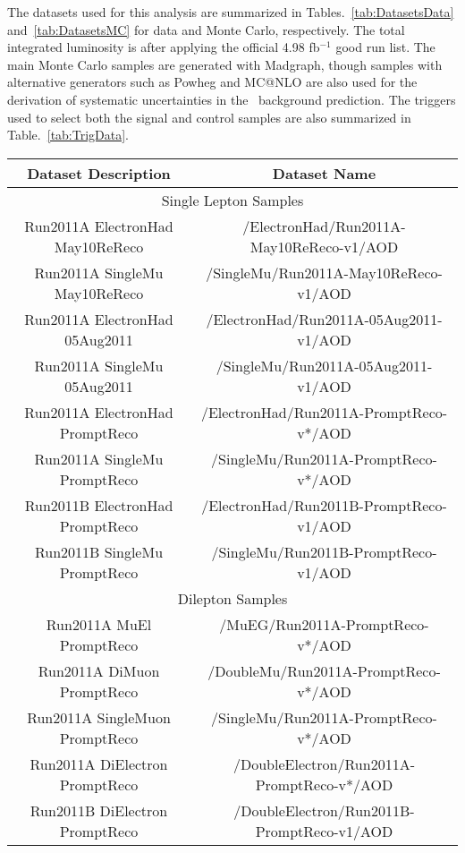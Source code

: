 
The datasets used for this analysis are summarized in 
Tables.~\ref{tab:DatasetsData} and~\ref{tab:DatasetsMC} for data and Monte 
Carlo, respectively. The total integrated luminosity is \lumi after
applying the official 4.98 fb$^{-1}$ good run list. The main Monte Carlo
samples are generated with Madgraph, though samples with
alternative generators such as Powheg and MC@NLO are also used for
the derivation of systematic uncertainties in the \ttbar~background prediction. 
The triggers used to select both the signal and control samples are
also summarized in Table.~\ref{tab:TrigData}.

\begin{table}[!ht]
\begin{center}
\begin{tabular}{c|c}
\hline
 Dataset Description                   &   Dataset Name   \\
\hline
\hline
\multicolumn{2}{c}{Single Lepton Samples} \\
\hline
Run2011A ElectronHad May10ReReco  & /ElectronHad/Run2011A-May10ReReco-v1/AOD \\
Run2011A SingleMu May10ReReco  & /SingleMu/Run2011A-May10ReReco-v1/AOD \\
Run2011A ElectronHad 05Aug2011  & /ElectronHad/Run2011A-05Aug2011-v1/AOD \\
Run2011A SingleMu 05Aug2011  & /SingleMu/Run2011A-05Aug2011-v1/AOD \\
Run2011A ElectronHad PromptReco  & /ElectronHad/Run2011A-PromptReco-v*/AOD \\
Run2011A SingleMu PromptReco  & /SingleMu/Run2011A-PromptReco-v*/AOD \\
Run2011B ElectronHad PromptReco  & /ElectronHad/Run2011B-PromptReco-v1/AOD \\
Run2011B SingleMu PromptReco  & /SingleMu/Run2011B-PromptReco-v1/AOD \\
\hline
\hline
\multicolumn{2}{c}{Dilepton Samples} \\
\hline
Run2011A MuEl PromptReco            &  /MuEG/Run2011A-PromptReco-v*/AOD   \\
Run2011A DiMuon PromptReco          &  /DoubleMu/Run2011A-PromptReco-v*/AOD   \\
Run2011A SingleMuon PromptReco      &  /SingleMu/Run2011A-PromptReco-v*/AOD   \\
Run2011A DiElectron PromptReco      &  /DoubleElectron/Run2011A-PromptReco-v*/AOD   \\
Run2011B DiElectron PromptReco      &  /DoubleElectron/Run2011B-PromptReco-v1/AOD   \\

\end{tabular}
\end{center}
\end{table}
